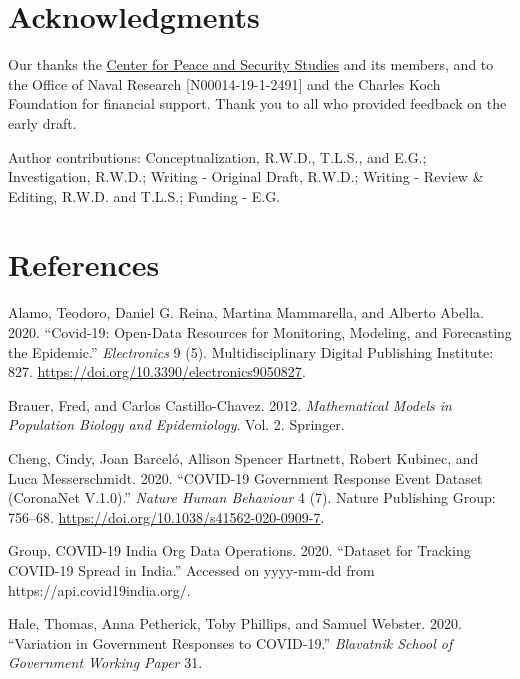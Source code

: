\documentclass[10pt,letterpaper]{article}
\begin{document}
\hypertarget{acknowledgments}{%
\section{Acknowledgments}\label{acknowledgments}}

Our thanks the \href{www.ucsd.cpass.edu}{Center for Peace and Security
Studies} and its members, and to the Office of Naval Research
{[}N00014-19-1-2491{]} and the Charles Koch Foundation for financial
support. Thank you to all who provided feedback on the early draft.

Author contributions: Conceptualization, R.W.D., T.L.S., and E.G.;
Investigation, R.W.D.; Writing - Original Draft, R.W.D.; Writing -
Review \& Editing, R.W.D. and T.L.S.; Funding - E.G.

\hypertarget{references}{%
\section*{References}\label{references}}

\hypertarget{refs}{}
\leavevmode\hypertarget{ref-alamoCovid19OpenDataResources2020}{}%
Alamo, Teodoro, Daniel G. Reina, Martina Mammarella, and Alberto Abella.
2020. ``Covid-19: Open-Data Resources for Monitoring, Modeling, and
Forecasting the Epidemic.'' \emph{Electronics} 9 (5). Multidisciplinary
Digital Publishing Institute: 827.
\url{https://doi.org/10.3390/electronics9050827}.

\leavevmode\hypertarget{ref-brauerMathematicalModelsPopulation2012}{}%
Brauer, Fred, and Carlos Castillo-Chavez. 2012. \emph{Mathematical
Models in Population Biology and Epidemiology}. Vol. 2. Springer.

\leavevmode\hypertarget{ref-chengCOVID19GovernmentResponse2020a}{}%
Cheng, Cindy, Joan Barceló, Allison Spencer Hartnett, Robert Kubinec,
and Luca Messerschmidt. 2020. ``COVID-19 Government Response Event
Dataset (CoronaNet V.1.0).'' \emph{Nature Human Behaviour} 4 (7). Nature
Publishing Group: 756--68.
\url{https://doi.org/10.1038/s41562-020-0909-7}.

\leavevmode\hypertarget{ref-covid19indiaorg2020tracker}{}%
Group, COVID-19 India Org Data Operations. 2020. ``Dataset for Tracking
COVID-19 Spread in India.'' Accessed on yyyy-mm-dd from
https://api.covid19india.org/.

\leavevmode\hypertarget{ref-haleVariationGovernmentResponses2020}{}%
Hale, Thomas, Anna Petherick, Toby Phillips, and Samuel Webster. 2020.
``Variation in Government Responses to COVID-19.'' \emph{Blavatnik
School of Government Working Paper} 31.
\end{document}
